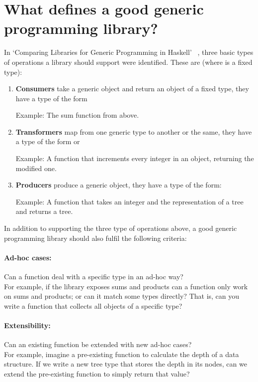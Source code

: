 \section*{What defines a good generic programming library?}
In `Comparing Libraries for Generic Programming in Haskell'~\cite{DBLP:conf/haskell/RodriguezJJGKO08}
, three basic types of operations a library should support were identified.
These are (where  is a fixed type):

\begin{enumerate}
    \item \textbf{Consumers} take a generic object and return an object of a fixed type, they have
           a type of the form 

           Example: The sum function from above.

    \item \textbf{Transformers} map from one generic type to another or the same, they have a type of the form
             or 

            Example: A function that increments every integer in an object, returning the modified one.

    \item \textbf{Producers} produce a generic object, they have a type of the form: 

            Example: A function that takes an integer and the representation of
                     a tree and returns a tree.
\end{enumerate}


In addition to supporting the three type of operations above, a good generic
programming library should also fulfil the following criteria:

\paragraph{Ad-hoc cases:} Can a function deal with a specific type in an ad-hoc way?
\\
For example, if the library exposes sums and products can a function
only work on sums and products; or can it match some types directly? That is,
can you write a function that collects all objects of a specific type?

\paragraph{Extensibility:} Can an existing function be extended with new ad-hoc cases?
\\
For example, imagine a pre-existing function to calculate the depth of a data
structure. If we write a new tree type that stores the depth in its nodes, can
we extend the pre-existing function to simply return that value?

